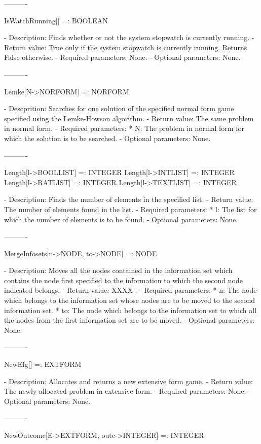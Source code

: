 ----------

IsWatchRunning[] =: BOOLEAN

   -	Description:  Finds whether or not the system stopwatch is currently
	running.
   -	Return value:  True only if the system stopwatch is currently running.
	Returns False otherwise.
   -	Required parameters:  None.
   -	Optional parameters:  None.

----------

Lemke[N->NORFORM] =: NORFORM

   -	Descprition:  Searches for one solution of the specified normal form 
	game specified using the Lemke-Howson algorithm.  
   -	Return value:  The same problem in normal form.	
   -	Required parameters:
	  *  N:  The problem in normal form for which the solution is to be 
	     searched.
   -	Optional parameters:  None.

----------

Length[l->BOOLLIST] =: INTEGER
Length[l->INTLIST] =: INTEGER
Length[l->RATLIST] =: INTEGER
Length[l->TEXTLIST] =: INTEGER

   -	Description:  Finds the number of elements in the specified list.
   -	Return value:  The number of elements found in the list.
   -	Required parameters:
	  *  l:  The list for which the number of elements is to be found.
   -	Optional parameters:  None.

----------

MergeInfosets[n->NODE, to->NODE] =: NODE

   -	Description:  Moves all the nodes contained in the information set 
	which contains the node first specified to the information to which the
	second node indicated belongs.
   -	Return value:  XXXX .
   -	Required parameters:
	  *  n:  The node which belongs to the information set whose nodes are
	     to be moved to the second information set.
	  *  to:  The node which belongs to the information set to which all
	     the nodes from the first information set are to be moved.
   -	Optional parameters:  None.

----------

NewEfg[] =: EXTFORM

   -	Description:  Allocates and returns a new extensive form game.
   -	Return value:  The newly allocated problem in extensive form.
   -	Required parameters:  None.
   -	Optional parameters:  None.

----------

NewOutcome[E->EXTFORM, {outc->INTEGER}] =: INTEGER

